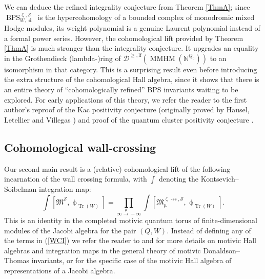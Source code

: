 \documentclass[a4paper,10pt]{amsart}
\renewcommand{\zeta}{\upzeta}
\renewcommand{\phi}{\upphi}
\renewcommand{\mu}{\upmu}
\newcommand{\SP}{\mathcal{S}}
\newcommand{\Mst}{\mathfrak{M}}
\DeclareMathOperator{\sst}{-ss}
\DeclareMathOperator{\MMHM}{MMHM}
\DeclareMathOperator{\dd}{\mathbf{d}}
\DeclareMathOperator{\DT}{BPS}
\DeclareMathOperator{\Tr}{Tr}
\newcommand{\Dulf}{\mathcal{D}^{\geq, \mathrm{lf}}}
\begin{document}
We can deduce the refined integrality conjecture from Theorem \ref{ThmA}; since $\DT_{W,\dd}^{\zeta,\SP}$ is the hypercohomology of a bounded complex of monodromic mixed Hodge modules, its weight polynomial is a genuine Laurent polynomial instead of a formal power series.  However, the cohomological lift provided by Theorem \ref{ThmA} is much stronger than the integrality conjecture.  It upgrades an equality in the Grothendieck (lambda-)ring of $\Dulf(\MMHM(\mathbb{N}^{Q_0}))$ to an isomorphism in that category.  This is a surprising result even before introducing the extra structure of the cohomological Hall algebra, since it shows that there is an entire theory of ``cohomologically refined'' BPS invariants waiting to be explored.  For early applications of this theory, we refer the reader to the first author's reproof of the Kac positivity conjecture \cite{Da13b} (originally proved by Hausel, Letellier and Villegas \cite{HLRV13}) and proof of the quantum cluster positivity conjecture \cite{Da16a}.
\subsection{Cohomological wall-crossing}
Our second main result is a (relative) cohomological lift of the following incarnation of the wall crossing formula, with $\int$ denoting the Kontsevich--Soibelman integration map:
\begin{equation}
\label{WCI}
\int[\Mst^{\SP},\phi_{\Tr(W)}]=\prod_{\infty\xrightarrow{\mu}-\infty}\int[\Mst^{\zeta\sst,\SP}_{\mu},\phi_{\Tr(W)}].
\end{equation}
This is an identity in the completed motivic quantum torus of finite-dimensional modules of the Jacobi algebra for the pair $(Q,W)$.  Instead of defining any of the terms in (\ref{WCI}) we refer the reader to \cite{JoyceMF} and \cite{KS1} for more details on motivic Hall algebras and integration maps in the general theory of motivic Donaldson--Thomas invariants, or \cite{DaMe4} for the specific case of the motivic Hall algebra of representations of a Jacobi algebra.  
  
\end{document}
